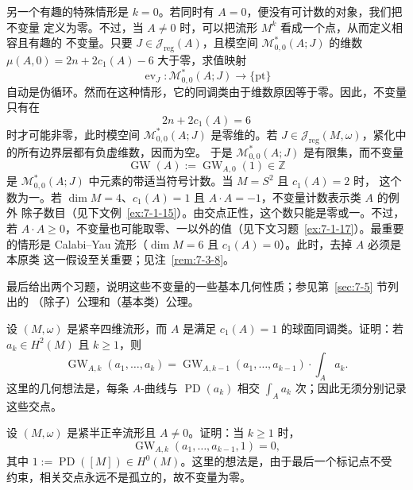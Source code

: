 \begin{example}\label{ex:7-1-4}
另一个有趣的特殊情形是 $k=0$。若同时有 $A=0$，便没有可计数的对象，我们把不变量
定义为零。不过，当 $A\ne0$ 时，可以把流形 $M^k$ 看成一个点，从而定义相容且有趣的
不变量。只要 $J\in\mathcal J_{\mathrm{reg}}(A)$，且模空间
$\mathcal M^*_{0,0}(A;J)$ 的维数
$\mu(A,0)=2n+2c_1(A)-6$ 大于零，求值映射
\[
  \operatorname{ev}_J:\mathcal M^*_{0,0}(A;J)\longrightarrow\{\mathrm{pt}\}
\]
自动是伪循环。然而在这种情形，它的同调类由于维数原因等于零。因此，不变量只有在
\[
  2n+2c_1(A)=6
\]
时才可能非零，此时模空间 $\mathcal M^*_{0,0}(A;J)$ 是零维的。若
$J\in\mathcal J_{\mathrm{reg}}(M,\omega)$，紧化中的所有边界层都有负虚维数，因而为空。
于是 $\mathcal M^*_{0,0}(A;J)$ 是有限集，而不变量
\[
  \operatorname{GW}(A):=\operatorname{GW}_{A,0}(1)\in\mathbb Z
\]
是 $\mathcal M^*_{0,0}(A;J)$ 中元素的带适当符号计数。当 $M=S^2$ 且 $c_1(A)=2$ 时，
这个数为一。若 $\dim M=4$、$c_1(A)=1$ 且 $A\cdot A=-1$，不变量计数表示类 $A$ 的例外
除子数目（见下文例~\ref{ex:7-1-15}）。由交点正性，这个数只能是零或一。不过，若
$A\cdot A\ge0$，不变量也可能取零、一以外的值（见下文习题~\ref{ex:7-1-17}）。最重要
的情形是 Calabi--Yau 流形（$\dim M=6$ 且 $c_1(A)=0$）。此时，去掉 $A$ 必须是本原类
这一假设至关重要；见注~\ref{rem:7-3-8}。
\end{example}

最后给出两个习题，说明这些不变量的一些基本几何性质；参见第~\ref{sec:7-5} 节列出的
（除子）公理和（基本类）公理。

\begin{exercise}\label{ex:7-1-5}
设 $(M,\omega)$ 是紧辛四维流形，而 $A$ 是满足 $c_1(A)=1$ 的球面同调类。证明：若
$a_k\in H^2(M)$ 且 $k\ge1$，则
\[
  \operatorname{GW}_{A,k}(a_1,\ldots,a_k)
  =\operatorname{GW}_{A,k-1}(a_1,\ldots,a_{k-1})\cdot\int_A a_k.
\]
这里的几何想法是，每条 $A$-曲线与 $\operatorname{PD}(a_k)$ 相交
$\int_Aa_k$ 次；因此无须分别记录这些交点。
\end{exercise}

\begin{exercise}\label{ex:7-1-6}
设 $(M,\omega)$ 是紧半正辛流形且 $A\ne0$。证明：当 $k\ge1$ 时，
\[
  \operatorname{GW}_{A,k}(a_1,\ldots,a_{k-1},1)=0,
\]
其中 $1:=\operatorname{PD}([M])\in H^0(M)$。这里的想法是，由于最后一个标记点不受
约束，相关交点永远不是孤立的，故不变量为零。
\end{exercise}

